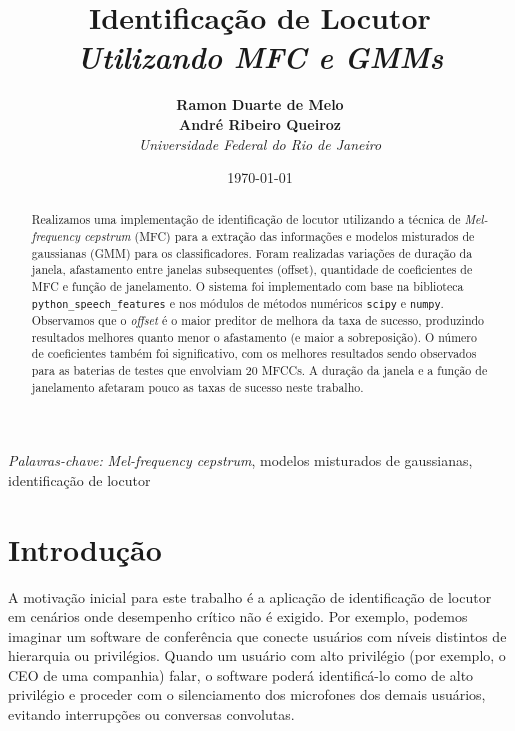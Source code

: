 \documentclass[12pt]{diazessay} %
\title{\textbf{Identificação de Locutor} \\ {\Large\itshape Utilizando MFC e GMMs}} %
\author{\textbf{Ramon Duarte de Melo \\ André Ribeiro Queiroz} \\ \textit{Universidade Federal do Rio de Janeiro}} %
\date{\today} %
\begin{document}
\maketitle %



\begin{abstract}
	Realizamos uma implementação de identificação de locutor utilizando a técnica de \emph{Mel-frequency cepstrum} (MFC) para a extração das informações e modelos misturados de gaussianas (GMM) para os classificadores.
	Foram realizadas variações de duração da janela, afastamento entre janelas subsequentes (offset), quantidade de coeficientes de MFC e função de janelamento.
	O sistema foi implementado com base na biblioteca \texttt{python\_speech\_features} e nos módulos de métodos numéricos \texttt{scipy} e \texttt{numpy}.
	Observamos que o \emph{offset} é o maior preditor de melhora da taxa de sucesso, produzindo resultados melhores quanto menor o afastamento (e maior a sobreposição).
	O número de coeficientes também foi significativo, com os melhores resultados sendo observados para as baterias de testes que envolviam 20 MFCCs.
	A duração da janela e a função de janelamento afetaram pouco as taxas de sucesso neste trabalho.

\end{abstract}

\hspace*{3.6mm}\textit{Palavras-chave:} \emph{Mel-frequency cepstrum}, modelos misturados de gaussianas, identificação de locutor %

\vspace{10pt} %


\section*{Introdução}

A motivação inicial para este trabalho é a aplicação de identificação de locutor em cenários onde desempenho crítico não é exigido.
Por exemplo, podemos imaginar um software de conferência que conecte usuários com níveis distintos de hierarquia ou privilégios.
Quando um usuário com alto privilégio (por exemplo, o CEO de uma companhia) falar, o software poderá identificá-lo como de alto privilégio e proceder com o silenciamento dos microfones dos demais usuários, evitando interrupções ou conversas convolutas.
\end{document}
